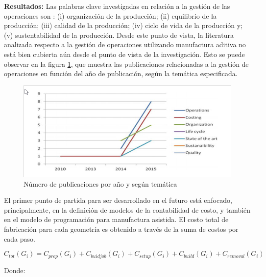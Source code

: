 \begin{description}
\item \textbf{Resultados:} Las palabras clave investigadas en relación a la gestión de las operaciones son \parencite{fera2018}: (i) organización de la producción; (ii) equilibrio de la producción; (iii) calidad de la producción; (iv) ciclo de vida de la producción y; (v) sustentabilidad de la producción. Desde este punto de vista, la literatura analizada respecto a la gestión de operaciones utilizando manufactura aditiva no está bien cubierta aún desde el punto de vista de la investigación. Esto se puede observar en la figura \ref{publicacionesgestion}, que muestra las publicaciones  relacionadas a la gestión de operaciones en función del año de publicación, según la temática especificada.

\begin{figure}[H]
\centering
\includegraphics[scale=0.7]{images/publicacionesgestion.png}
\caption{Número de publicaciones por año y según temática \parencite{fera2018}}
\label{publicacionesgestion}
\end{figure}

El primer punto de partida para ser desarrollado en el futuro está enfocado, principalmente, en la definición de modelos de la contabilidad de costo, y también en el modelo de programación para manufactura asistida.
El costo total de fabricación para cada geometría es obtenido a través de la suma de costos por cada paso. 


$$C_{tot}(G_i)=C_{prep}(G_i)+C_{buidjob}(G_i)+C_{setup}(G_i)+C_{build}(G_i)+C_{removal}(G_i)$$ 

Donde:


\end{description}
